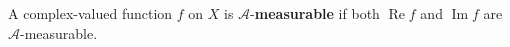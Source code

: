 A complex-valued function $f$ on $X$ is $\mathcal{A}$-\textbf{measurable} if both $\operatorname{Re} f$ and $\operatorname{Im} f$ are $\mathcal{A}$-measurable.
